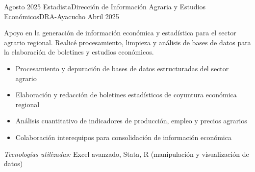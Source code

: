 \experience
{Agosto 2025} {Estadista}{Dirección de Información Agraria y Estudios Económicos}{DRA-Ayacucho}
{Abril 2025} {
	Apoyo en la generación de información económica y estadística para el sector agrario regional. Realicé procesamiento, limpieza y análisis de bases de datos para la elaboración de boletines y estudios económicos.
	\begin{itemize}
		\item Procesamiento y depuración de bases de datos estructuradas del sector agrario
		\item Elaboración y redacción de boletines estadísticos de coyuntura económica regional
		\item Análisis cuantitativo de indicadores de producción, empleo y precios agrarios
		\item Colaboración interequipos para consolidación de información económica
	\end{itemize}
}
{\footnotesize{\emph{Tecnologías utilizadas:} Excel avanzado, Stata, R (manipulación y visualización de datos)}}
